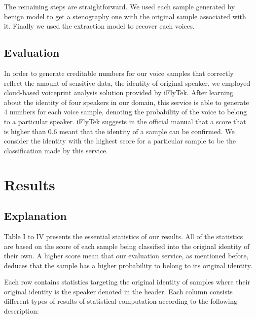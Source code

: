 \documentclass[journal]{IEEEtran} %
\begin{document}
\begin{CJK*}{UTF8}{gbsn}
The remaining steps are straightforward. We used each sample generated by benign model to get a stenography one with the original sample associated with it. Finally we used the extraction model to recover each voices.

\subsection{Evaluation}

In order to generate creditable numbers for our voice samples that correctly reflect the amount of sensitive data, the identity of original speaker, we employed cloud-based voiceprint analysis solution provided by iFlyTek. After learning about the identity of four speakers in our domain, this service is able to generate 4 numbers for each voice sample, denoting the probability of the voice to belong to a particular speaker. iFlyTek suggests in the official manual that a score that is higher than 0.6 meant that the identity of a sample can be confirmed. We consider the identity with the highest score for a particular sample to be the classification made by this service.

\section{Results}

\subsection{Explanation}

Table I to IV presents the essential statistics of our results. All of the statistics are based on the score of each sample being classified into the original identity of their own. A higher score mean that our evaluation service, as mentioned before, deduces that the sample has a higher probability to belong to its original identity.

Each row contains statistics targeting the original identity of samples where their original identity is the speaker denoted in the header. Each column consists different types of results of statistical computation according to the following description:


\end{CJK*}
\end{document}
